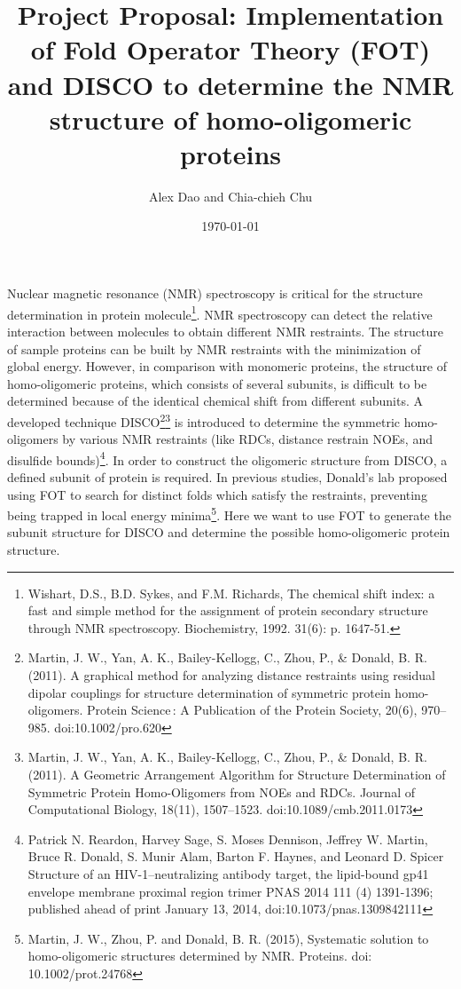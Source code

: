 \documentclass{article}
\title{Project Proposal: Implementation of Fold Operator Theory (FOT) and DISCO to determine the NMR structure of homo-oligomeric proteins}
\date{\today}
\author{Alex Dao and Chia-chieh Chu}
\begin{document}
\maketitle
Nuclear magnetic resonance (NMR) spectroscopy is critical for the structure determination in protein molecule\footnote{Wishart, D.S., B.D. Sykes, and F.M. Richards, The chemical shift index: a fast and simple method for the assignment of protein secondary structure through NMR spectroscopy. Biochemistry, 1992. 31(6): p. 1647-51.}. NMR spectroscopy can detect the relative interaction between molecules to obtain different NMR restraints. The structure of sample proteins can be built by NMR restraints with the minimization of global energy. However, in comparison with monomeric proteins, the structure of homo-oligomeric proteins, which consists of several subunits, is difficult to be determined because of the identical chemical shift from different subunits. A developed technique DISCO\footnote{Martin, J. W., Yan, A. K., Bailey-Kellogg, C., Zhou, P., \& Donald, B. R. (2011). A graphical method for analyzing distance restraints using residual dipolar couplings for structure determination of symmetric protein homo-oligomers. Protein Science : A Publication of the Protein Society, 20(6), 970–985. doi:10.1002/pro.620}\footnote{Martin, J. W., Yan, A. K., Bailey-Kellogg, C., Zhou, P., \& Donald, B. R. (2011). A Geometric Arrangement Algorithm for Structure Determination of Symmetric Protein Homo-Oligomers from NOEs and RDCs. Journal of Computational Biology, 18(11), 1507–1523. doi:10.1089/cmb.2011.0173}
is introduced to determine the symmetric homo-oligomers by various NMR restraints (like RDCs, distance restrain NOEs, and disulfide bounds)\footnote{Patrick N. Reardon, Harvey Sage, S. Moses Dennison, Jeffrey W. Martin, Bruce R. Donald, S. Munir Alam, Barton F. Haynes, and Leonard D. Spicer
Structure of an HIV-1–neutralizing antibody target, the lipid-bound gp41 envelope membrane proximal region trimer
PNAS 2014 111 (4) 1391-1396; published ahead of print January 13, 2014, doi:10.1073/pnas.1309842111}. In order to construct the oligomeric structure from DISCO, a defined subunit of protein is required. In previous studies, Donald’s lab proposed using FOT to search for distinct folds which satisfy the restraints, preventing being trapped in local energy minima\footnote{Martin, J. W., Zhou, P. and Donald, B. R. (2015), Systematic solution to homo-oligomeric structures determined by NMR. Proteins. doi: 10.1002/prot.24768}. Here we want to use FOT to generate the subunit structure for DISCO and determine the possible homo-oligomeric protein structure.
\end{document}
